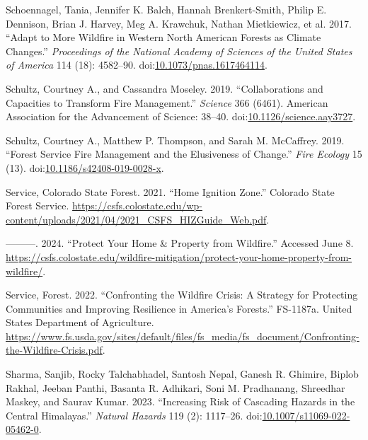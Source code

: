 \documentclass[
]{article}
\newlength{\cslhangindent}
\newenvironment{CSLReferences}[2] %
 {\begin{list}{}{%
  \setlength{\itemindent}{0pt}
  \setlength{\leftmargin}{0pt}
  \setlength{\parsep}{0pt}
  \ifodd #1
   \setlength{\leftmargin}{\cslhangindent}
   \setlength{\itemindent}{-1\cslhangindent}
  \fi
  \setlength{\itemsep}{#2\baselineskip}}}
 {\end{list}}
\begin{document}
\begin{CSLReferences}{1}{0}
Schoennagel, Tania, Jennifer K. Balch, Hannah Brenkert-Smith, Philip E. Dennison, Brian J. Harvey, Meg A. Krawchuk, Nathan Mietkiewicz, et al. 2017. {``Adapt to More Wildfire in Western {North American} Forests as Climate Changes.''} \emph{Proceedings of the National Academy of Sciences of the United States of America} 114 (18): 4582--90. doi:\href{https://doi.org/10.1073/pnas.1617464114}{10.1073/pnas.1617464114}.

Schultz, Courtney A., and Cassandra Moseley. 2019. {``Collaborations and Capacities to Transform Fire Management.''} \emph{Science} 366 (6461). American Association for the Advancement of Science: 38--40. doi:\href{https://doi.org/10.1126/science.aay3727}{10.1126/science.aay3727}.

Schultz, Courtney A., Matthew P. Thompson, and Sarah M. McCaffrey. 2019. {``Forest {Service} Fire Management and the Elusiveness of Change.''} \emph{Fire Ecology} 15 (13). doi:\href{https://doi.org/10.1186/s42408-019-0028-x}{10.1186/s42408-019-0028-x}.

Service, Colorado State Forest. 2021. {``Home {Ignition Zone}.''} Colorado State Forest Service. \url{https://csfs.colostate.edu/wp-content/uploads/2021/04/2021_CSFS_HIZGuide_Web.pdf}.

---------. 2024. {``Protect {Your Home} \& {Property} from {Wildfire}.''} Accessed June 8. \url{https://csfs.colostate.edu/wildfire-mitigation/protect-your-home-property-from-wildfire/}.

Service, Forest. 2022. {``Confronting the {Wildfire Crisis}: {A Strategy} for {Protecting Communities} and {Improving Resilience} in {America}'s {Forests}.''} FS-1187a. United States Department of Agriculture. \url{https://www.fs.usda.gov/sites/default/files/fs_media/fs_document/Confronting-the-Wildfire-Crisis.pdf}.

Sharma, Sanjib, Rocky Talchabhadel, Santosh Nepal, Ganesh R. Ghimire, Biplob Rakhal, Jeeban Panthi, Basanta R. Adhikari, Soni M. Pradhanang, Shreedhar Maskey, and Saurav Kumar. 2023. {``Increasing Risk of Cascading Hazards in the Central {Himalayas}.''} \emph{Natural Hazards} 119 (2): 1117--26. doi:\href{https://doi.org/10.1007/s11069-022-05462-0}{10.1007/s11069-022-05462-0}.


\end{CSLReferences}
\end{document}
